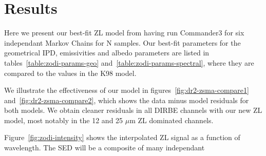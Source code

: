 \documentclass[twocolumn]{aa}
\begin{document}
\section{Results}\label{sect:improved-model}
Here we present our best-fit ZL model from having run Commander3 for six independant
Markov Chains for N samples. Our best-fit parameters for the geometrical IPD, emissivities 
and albedo parameters are listed in tables~\ref{table:zodi-params-geo} 
and~\ref{table:zodi-params-spectral}, where they are compared to the values in the K98 model.


We illustrate the effectiveness of our model in figures~\ref{fig:dr2-zsma-compare1} 
and~\ref{fig:dr2-zsma-compare2}, which shows the data minus model residuals for both models.
We obtain cleaner residuals in all DIRBE channels with our new ZL model, most notably in the 12 and 25 $\mu$m  
ZL dominated channels.

Figure~\ref{fig:zodi-intensity} shows the interpolated ZL signal as a function of wavelength. The SED will be a composite of many independant 
\end{document}
